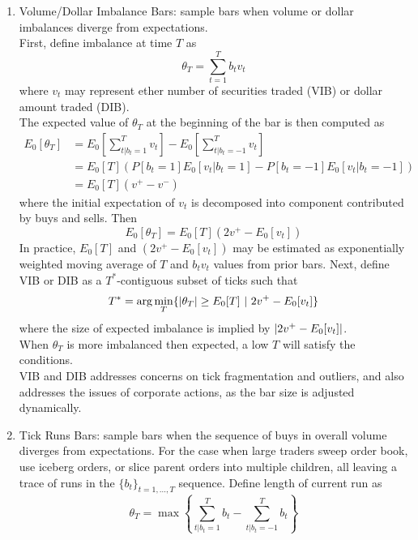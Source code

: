 \documentclass[a4paper,oneside,openany]{book}
\begin{document}
\begin{remark}
\begin{enumerate}[label=\roman*.]
\item Volume/Dollar Imbalance Bars: sample bars when volume or dollar imbalances diverge from expectations.\\
First, define imbalance at time $T$ as
\begin{equation*}
\theta_T = \sum\limits_{t=1}^T b_t v_t \nonumber
\end{equation*}
where $v_t$ may represent ether number of securities traded (VIB) or dollar amount traded (DIB).\\
The expected value of $\theta_T$ at the beginning of the bar is then computed as
\begin{align}
E_0[\theta_T] &= E_0 \left[ \sum\limits_{t \vert b_t = 1}^T v_t \right] - E_0 \left[ \sum\limits_{t \vert b_t = -1}^T v_t \right] \nonumber \\
&= E_0[T] (P[b_t = 1]E_0[v_t \vert b_t = 1] - P[b_t = -1]E_0[v_t \vert b_t = -1]) \nonumber \\
&= E_0[T] (v^+ - v^-) \nonumber
\end{align}
where the initial expectation of $v_t$ is decomposed into component contributed by buys and sells. Then
\begin{equation*}
E_0[\theta_T] = E_0[T] (2v^+ - E_0 [v_t]) \nonumber
\end{equation*}
In practice, $E_0[T]$ and $(2v^+ - E_0 [v_t])$ may be estimated as exponentially weighted moving average of $T$ and $b_t v_t$ values from prior bars. Next, define VIB or DIB as a $T^*$-contiguous subset of ticks such that
\begin{equation*}
T^* = \arg \min_T \{ \left\lvert\theta_T\right\rvert \geq E_0[T] \ \vert \ 2v^+ - E_0[v_t] \} \nonumber
\end{equation*}
where the size of expected imbalance is implied by $\left\lvert2v^+ - E_0[v_t]\right\rvert$.\\
When $\theta_T$ is more imbalanced then expected, a low $T$ will satisfy the conditions.\\
VIB and DIB addresses concerns on tick fragmentation and outliers, and also addresses the issues of corporate actions, as the bar size is adjusted dynamically.
\item Tick Runs Bars: sample bars when the sequence of buys in overall volume diverges from expectations. For the case when large traders sweep order book, use iceberg orders, or slice parent orders into multiple children, all leaving a trace of runs in the $\{b_t\}_{t = 1, \ldots, T}$ sequence. Define length of current run as
\begin{equation*}
\theta_T = \max \left\{ \sum\limits_{t \vert b_t = 1}^T b_t - \sum\limits_{t \vert b_t = -1}^T b_t  \right\} \nonumber

\end{equation*}
\end{enumerate}
\end{remark}
\end{document}
